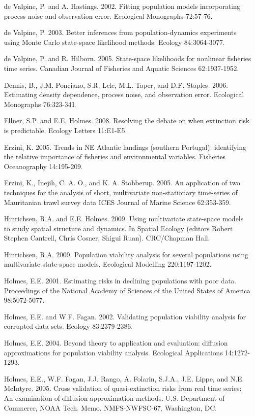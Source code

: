 de Valpine, P. and A. Hastings. 2002. Fitting population models incorporating process noise and observation error. Ecological Monographs 72:57-76.

de Valpine, P. 2003. Better inferences from population-dynamics experiments using Monte Carlo state-space likelihood methods. Ecology 84:3064-3077.

de Valpine, P. and R. Hilborn. 2005. State-space likelihoods for nonlinear fisheries time series. Canadian Journal of Fisheries and Aquatic Sciences 62:1937-1952.

Dennis, B., J.M. Ponciano, S.R. Lele, M.L. Taper, and D.F. Staples. 2006. Estimating density dependence, process noise, and observation error. Ecological Monographs 76:323-341.

Ellner, S.P. and E.E. Holmes. 2008. Resolving the debate on when extinction risk is predictable. Ecology Letters 11:E1-E5.

Erzini, K. 2005. Trends in NE Atlantic landings (southern Portugal): identifying the relative importance of fisheries and environmental variables.  Fisheries Oceanography 14:195-209.

Erzini, K., Inejih, C. A. O., and K. A. Stobberup. 2005. An application of two techniques for the analysis of short, multivariate non-stationary time-series of Mauritanian trawl survey data ICES Journal of Marine Science 62:353-359.

Hinrichsen, R.A. and E.E. Holmes. 2009. Using multivariate state-space models to study spatial structure and dynamics. In Spatial Ecology (editors Robert Stephen Cantrell, Chris Cosner, Shigui Ruan). CRC/Chapman Hall.

Hinrichsen, R.A. 2009. Population viability analysis for several populations using multivariate state-space models. Ecological Modelling 220:1197-1202.

Holmes, E.E. 2001. Estimating risks in declining populations with poor data. Proceedings of the National Academy of Sciences of the United States of America 98:5072-5077.

Holmes, E.E. and W.F. Fagan. 2002. Validating population viability analysis for corrupted data sets. Ecology 83:2379-2386.

Holmes, E.E. 2004. Beyond theory to application and evaluation: diffusion approximations for population viability analysis. Ecological Applications 14:1272-1293.

Holmes, E.E., W.F. Fagan, J.J. Rango, A. Folarin, S.J.A., J.E. Lippe, and N.E. McIntyre. 2005. Cross validation of quasi-extinction risks from real time series: An examination of diffusion approximation methods. U.S. Department of Commerce, NOAA Tech. Memo. NMFS-NWFSC-67, Washington, DC.

